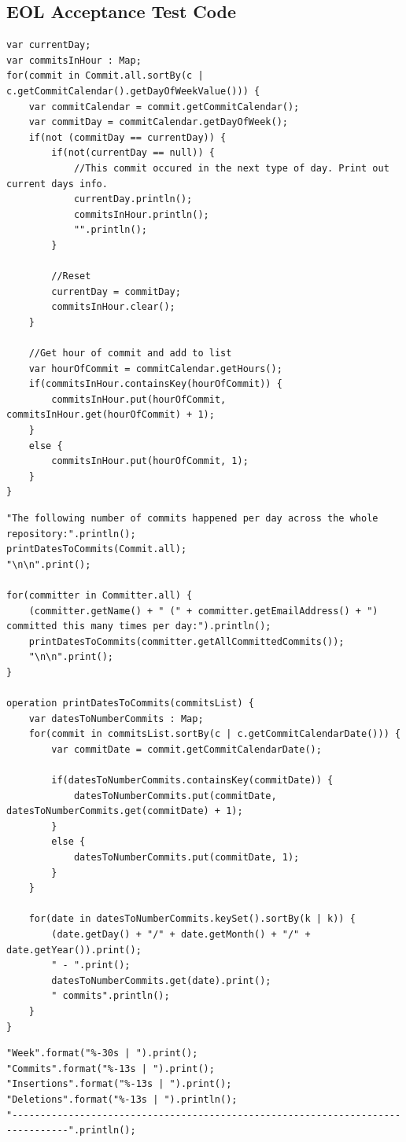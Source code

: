 \documentclass[11pt]{book}
\begin{document}
\printbibliography

\begin{appendices}
\noappendicestocpagenum
\addappheadtotoc
\chapter{EOL Acceptance Test Code}
\label{eolacceptance}

\begin{lstlisting}[caption=Punchcard, label=lst:punchcard]
var currentDay;
var commitsInHour : Map;
for(commit in Commit.all.sortBy(c | c.getCommitCalendar().getDayOfWeekValue())) {
	var commitCalendar = commit.getCommitCalendar();
	var commitDay = commitCalendar.getDayOfWeek();
	if(not (commitDay == currentDay)) {
		if(not(currentDay == null)) {
			//This commit occured in the next type of day. Print out current days info.
			currentDay.println();
			commitsInHour.println();
			"".println();
		}
		
		//Reset
		currentDay = commitDay;
		commitsInHour.clear();
	}
	
	//Get hour of commit and add to list
	var hourOfCommit = commitCalendar.getHours();
	if(commitsInHour.containsKey(hourOfCommit)) {
		commitsInHour.put(hourOfCommit, commitsInHour.get(hourOfCommit) + 1);
	}
	else {
		commitsInHour.put(hourOfCommit, 1);
	}
}
\end{lstlisting}
\clearpage
\begin{lstlisting}[caption=Contribution Dates, label=lst:contributiondates]
"The following number of commits happened per day across the whole repository:".println();
printDatesToCommits(Commit.all);
"\n\n".print();

for(committer in Committer.all) {
	(committer.getName() + " (" + committer.getEmailAddress() + ") committed this many times per day:").println();
	printDatesToCommits(committer.getAllCommittedCommits());
	"\n\n".print();
}

operation printDatesToCommits(commitsList) {  
	var datesToNumberCommits : Map;
	for(commit in commitsList.sortBy(c | c.getCommitCalendarDate())) {
		var commitDate = commit.getCommitCalendarDate();
	
		if(datesToNumberCommits.containsKey(commitDate)) {
			datesToNumberCommits.put(commitDate, datesToNumberCommits.get(commitDate) + 1);
		}
		else {
			datesToNumberCommits.put(commitDate, 1);
		}
	}
	
	for(date in datesToNumberCommits.keySet().sortBy(k | k)) {
		(date.getDay() + "/" + date.getMonth() + "/" + date.getYear()).print();
		" - ".print();
		datesToNumberCommits.get(date).print();
		" commits".println();
	}
}
\end{lstlisting}
\clearpage
\begin{lstlisting}[caption=Commit frequency, label=lst:commitfrequency]
"Week".format("%-30s | ").print();
"Commits".format("%-13s | ").print();
"Insertions".format("%-13s | ").print();
"Deletions".format("%-13s | ").println();
"--------------------------------------------------------------------------------".println();



\end{lstlisting}
\end{appendices}
\end{document}
